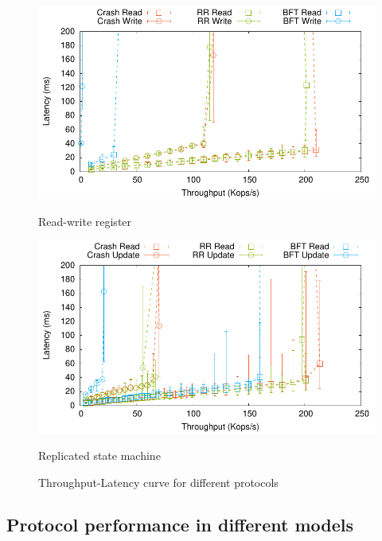 \begin{figure}[th!]
    \centering
    \begin{minipage}[t]{0.45\linewidth}
        \includegraphics[width=\linewidth]{teem_results/protocol/1ms/reg-tput/result/reg}
        \caption{Read-write register}\label{fig:reg_tputlat}
    \end{minipage}
    \begin{minipage}[t]{0.45\linewidth}
        \includegraphics[width=\linewidth]{teem_results/protocol/1ms/smr-tput/result/smr}
        \caption{Replicated state machine}\label{fig:smr_tputlat}
    \end{minipage}
    \caption{Throughput-Latency curve for different protocols}
\end{figure}


\subsection{Protocol performance in different models}\label{ssec:eval_quorum}

